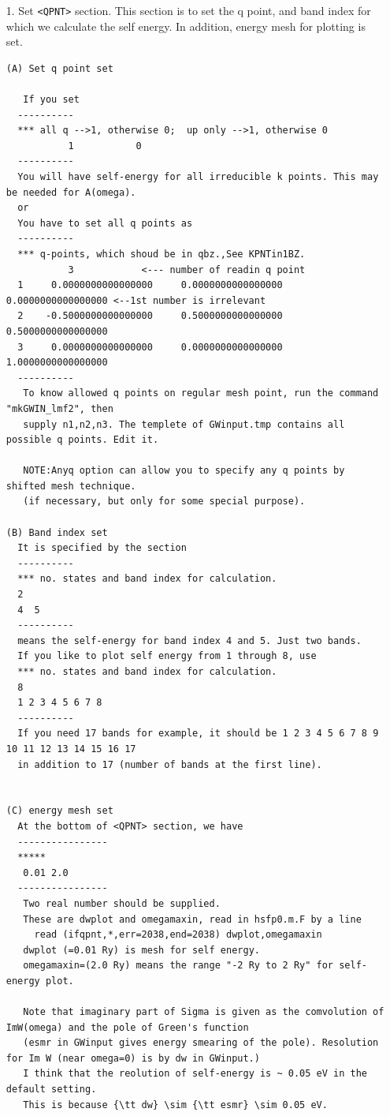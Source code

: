 \documentclass[a4paper,10pt,epsf,fleqn]{article}
\begin{document}
\begin{enumerate}
\item[1.] 
 Set {\tt <QPNT>} section. This section is to set the q point, and band index
 for which we calculate the self energy. In addition, energy mesh for plotting is set.

\begin{verbatim}
(A) Set q point set 

   If you set 
  ----------
  *** all q -->1, otherwise 0;  up only -->1, otherwise 0
           1           0
  ----------
  You will have self-energy for all irreducible k points. This may be needed for A(omega).
  or 
  You have to set all q points as
  ----------
  *** q-points, which shoud be in qbz.,See KPNTin1BZ.
           3            <--- number of readin q point 
  1     0.0000000000000000     0.0000000000000000     0.0000000000000000 <--1st number is irrelevant
  2    -0.5000000000000000     0.5000000000000000     0.5000000000000000
  3     0.0000000000000000     0.0000000000000000     1.0000000000000000
  ----------
   To know allowed q points on regular mesh point, run the command "mkGWIN_lmf2", then
   supply n1,n2,n3. The templete of GWinput.tmp contains all possible q points. Edit it.
  
   NOTE:Anyq option can allow you to specify any q points by shifted mesh technique.
   (if necessary, but only for some special purpose).

(B) Band index set
  It is specified by the section
  ----------
  *** no. states and band index for calculation.
  2
  4  5
  ----------
  means the self-energy for band index 4 and 5. Just two bands.
  If you like to plot self energy from 1 through 8, use
  *** no. states and band index for calculation.
  8
  1 2 3 4 5 6 7 8
  ----------
  If you need 17 bands for example, it should be 1 2 3 4 5 6 7 8 9 10 11 12 13 14 15 16 17
  in addition to 17 (number of bands at the first line).   


(C) energy mesh set
  At the bottom of <QPNT> section, we have
  ----------------
  *****
   0.01 2.0
  ----------------
   Two real number should be supplied.
   These are dwplot and omegamaxin, read in hsfp0.m.F by a line 
     read (ifqpnt,*,err=2038,end=2038) dwplot,omegamaxin
   dwplot (=0.01 Ry) is mesh for self energy.
   omegamaxin=(2.0 Ry) means the range "-2 Ry to 2 Ry" for self-energy plot.

   Note that imaginary part of Sigma is given as the comvolution of ImW(omega) and the pole of Green's function
   (esmr in GWinput gives energy smearing of the pole). Resolution for Im W (near omega=0) is by dw in GWinput.)
   I think that the reolution of self-energy is ~ 0.05 eV in the default setting.
   This is because {\tt dw} \sim {\tt esmr} \sim 0.05 eV. 


\end{verbatim}
\end{enumerate}
\end{document}
